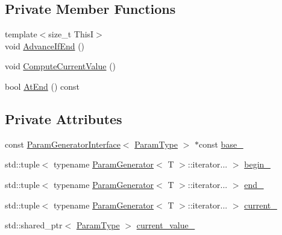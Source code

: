 \subsection*{Private Member Functions}
\begin{DoxyCompactItemize}
\item 
{\footnotesize template$<$size\+\_\+t ThisI$>$ }\\void \hyperlink{classtesting_1_1internal_1_1CartesianProductGenerator_1_1IteratorImpl_3_01IndexSequence_3_01I_8_8_8_01_4_01_4_a6a5fd8b4a0cd8e27c0ca1fbbfee4f997}{Advance\+If\+End} ()
\item 
void \hyperlink{classtesting_1_1internal_1_1CartesianProductGenerator_1_1IteratorImpl_3_01IndexSequence_3_01I_8_8_8_01_4_01_4_a0e6c088fed9a27254a657755d05bdcae}{Compute\+Current\+Value} ()
\item 
bool \hyperlink{classtesting_1_1internal_1_1CartesianProductGenerator_1_1IteratorImpl_3_01IndexSequence_3_01I_8_8_8_01_4_01_4_abdf53ad1a435b992d399210178b35b70}{At\+End} () const
\end{DoxyCompactItemize}
\subsection*{Private Attributes}
\begin{DoxyCompactItemize}
\item 
const \hyperlink{classtesting_1_1internal_1_1ParamGeneratorInterface}{Param\+Generator\+Interface}$<$ \hyperlink{classtesting_1_1internal_1_1CartesianProductGenerator_af27131157a9347f0c82420ca081ee7dd}{Param\+Type} $>$ $\ast$const \hyperlink{classtesting_1_1internal_1_1CartesianProductGenerator_1_1IteratorImpl_3_01IndexSequence_3_01I_8_8_8_01_4_01_4_ae434c3fd6b3fc5055960563a6d550376}{base\+\_\+}
\item 
std\+::tuple$<$ typename \hyperlink{classtesting_1_1internal_1_1ParamGenerator}{Param\+Generator}$<$ T $>$\+::iterator... $>$ \hyperlink{classtesting_1_1internal_1_1CartesianProductGenerator_1_1IteratorImpl_3_01IndexSequence_3_01I_8_8_8_01_4_01_4_aae7fbddbf01df185226712ee2a38d410}{begin\+\_\+}
\item 
std\+::tuple$<$ typename \hyperlink{classtesting_1_1internal_1_1ParamGenerator}{Param\+Generator}$<$ T $>$\+::iterator... $>$ \hyperlink{classtesting_1_1internal_1_1CartesianProductGenerator_1_1IteratorImpl_3_01IndexSequence_3_01I_8_8_8_01_4_01_4_aae9ccfd177834224412f9ac194bd8b68}{end\+\_\+}
\item 
std\+::tuple$<$ typename \hyperlink{classtesting_1_1internal_1_1ParamGenerator}{Param\+Generator}$<$ T $>$\+::iterator... $>$ \hyperlink{classtesting_1_1internal_1_1CartesianProductGenerator_1_1IteratorImpl_3_01IndexSequence_3_01I_8_8_8_01_4_01_4_a0678508a97f8b218fb5af11915678abf}{current\+\_\+}
\item 
std\+::shared\+\_\+ptr$<$ \hyperlink{classtesting_1_1internal_1_1CartesianProductGenerator_af27131157a9347f0c82420ca081ee7dd}{Param\+Type} $>$ \hyperlink{classtesting_1_1internal_1_1CartesianProductGenerator_1_1IteratorImpl_3_01IndexSequence_3_01I_8_8_8_01_4_01_4_ab7ce5ae5ae5dbdcca97e1824d77736b0}{current\+\_\+value\+\_\+}
\end{DoxyCompactItemize}


